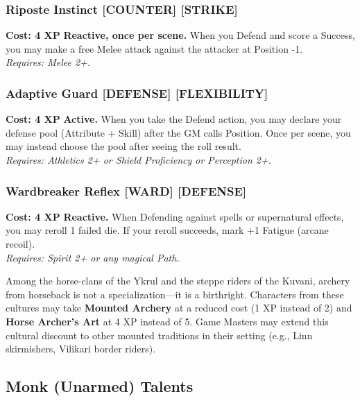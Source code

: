 \subsubsection*{Riposte Instinct \textnormal{[COUNTER] [STRIKE]}}
\label{talent:riposte-instinct}
\textbf{Cost: 4 XP} \textbf{Reactive, once per scene.} When you Defend and score a Success, you may make a free Melee attack against the attacker at Position -1. \\
\textit{Requires: Melee 2+.}

\subsubsection*{Adaptive Guard \textnormal{[DEFENSE] [FLEXIBILITY]}}
\label{talent:adaptive-guard}
\textbf{Cost: 4 XP} \textbf{Active.} When you take the Defend action, you may declare your defense pool (Attribute + Skill) after the GM calls Position. Once per scene, you may instead choose the pool after seeing the roll result. \\
\textit{Requires: Athletics 2+ or Shield Proficiency or Perception 2+.}

\subsubsection*{Wardbreaker Reflex \textnormal{[WARD] [DEFENSE]}}
\label{talent:wardbreaker-reflex}
\textbf{Cost: 4 XP} \textbf{Reactive.} When Defending against spells or supernatural effects, you may reroll 1 failed die. If your reroll succeeds, mark +1 Fatigue (arcane recoil). \\
\textit{Requires: Spirit 2+ or any magical Path.}

\begin{tcolorbox}[colback=blue!5!white,colframe=blue!75!black,title=\textbf{Mounted Combat Traditions},breakable]
Among the horse-clans of the Ykrul and the steppe riders of the Kuvani, archery from horseback is not a specialization---it is a birthright. Characters from these cultures may take \textbf{Mounted Archery} at a reduced cost (1 XP instead of 2) and \textbf{Horse Archer's Art} at 4 XP instead of 5. Game Masters may extend this cultural discount to other mounted traditions in their setting (e.g., Linn skirmishers, Vilikari border riders).
\end{tcolorbox}

\subsection*{Monk (Unarmed) Talents}
\label{sec:major-monk}

